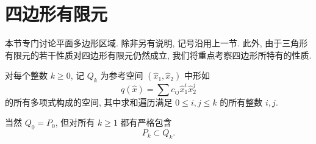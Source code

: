 \section{四边形有限元}\label{sec:appendix-quadrilateral-finite-elements}

本节专门讨论平面多边形区域. 除非另有说明, 记号沿用上一节.
此外, 由于三角形有限元的若干性质对四边形有限元仍然成立,
我们将重点考察四边形所特有的性质.

\setcounter{statement}{2}
\begin{Definition}\label{def:appendix-polynomial-space-qk}
对每个整数 $k\geq0$, 记 $Q_k$ 为参考空间
$(\hat x_1,\hat x_2)$ 中形如
\[
q(\hat x)=\sum c_{ij}\hat x_1^i\hat x_2^j
\]
的所有多项式构成的空间, 其中求和遍历满足 $0\leq i,j\leq k$
的所有整数 $i,j$.
\end{Definition}

当然 $Q_0=P_0$, 但对所有 $k\geq1$ 都有严格包含
\[
P_k\subset Q_k.
\]
